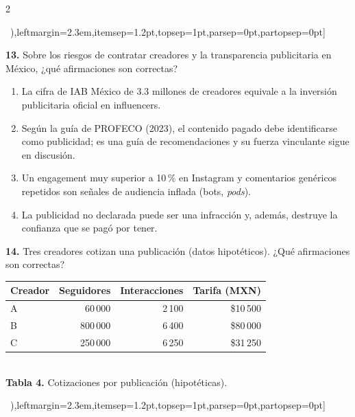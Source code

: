 \documentclass[10pt,letterpaper]{article}
\newcommand{\cas}{\framebox[1.0em]{\rule{0pt}{1.05ex}}}
\begin{document}
\begin{multicols}{2}
\begin{minipage}[t]{\columnwidth}
\begin{enumerate}[label=\cas\ \alph*),leftmargin=2.3em,itemsep=1.2pt,topsep=1pt,parsep=0pt,partopsep=0pt]
\end{enumerate}\end{minipage}\par\vspace{3pt}
\begin{minipage}[t]{\columnwidth}\noindent\textbf{13.} Sobre los riesgos de contratar creadores y la transparencia publicitaria en México, ¿qué afirmaciones son correctas?
\vspace{1pt}\begin{enumerate}[label=\cas\ \alph*),leftmargin=2.3em,itemsep=1.2pt,topsep=1pt,parsep=0pt,partopsep=0pt]
\item La cifra de IAB México de 3.3 millones de creadores equivale a la inversión publicitaria oficial en influencers.
\item Según la guía de PROFECO (2023), el contenido pagado debe identificarse como publicidad; es una guía de recomendaciones y su fuerza vinculante sigue en discusión.
\item Un engagement muy superior a 10\,\% en Instagram y comentarios genéricos repetidos son señales de audiencia inflada (bots, \textit{pods}).
\item La publicidad no declarada puede ser una infracción y, además, destruye la confianza que se pagó por tener.
\end{enumerate}\end{minipage}\par\vspace{3pt}
\begin{minipage}[t]{\columnwidth}\noindent\textbf{14.} Tres creadores cotizan una publicación (datos hipotéticos). ¿Qué afirmaciones son correctas?
\begin{center}{\scriptsize\renewcommand{\arraystretch}{1.05}\begin{tabular}{@{}lrrr@{}}\toprule
Creador & Seguidores & Interacciones & Tarifa (MXN)\\\midrule
A & 60\,000 & 2\,100 & \$10\,500\\ B & 800\,000 & 6\,400 & \$80\,000\\ C & 250\,000 & 6\,250 & \$31\,250\\\bottomrule\end{tabular}}\\[1pt]{\tiny\textbf{Tabla 4.} Cotizaciones por publicación (hipotéticas).}\end{center}
\vspace{1pt}\begin{enumerate}[label=\cas\ \alph*),leftmargin=2.3em,itemsep=1.2pt,topsep=1pt,parsep=0pt,partopsep=0pt]

\end{enumerate}
\end{minipage}
\end{multicols}
\end{document}

